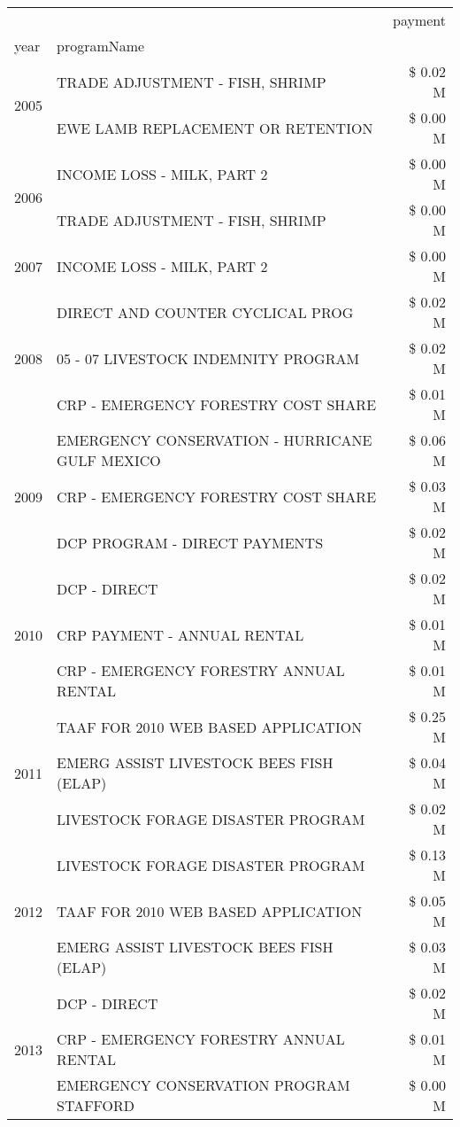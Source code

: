 \begin{tabular}{llr}
\toprule
 &  & payment \\
year & programName &  \\
\midrule
\multirow[t]{2}{*}{2005} & TRADE ADJUSTMENT - FISH, SHRIMP & \$ 0.02 M \\
 & EWE LAMB REPLACEMENT OR RETENTION & \$ 0.00 M \\
\cline{1-3}
\multirow[t]{2}{*}{2006} & INCOME LOSS - MILK, PART 2 & \$ 0.00 M \\
 & TRADE ADJUSTMENT - FISH, SHRIMP & \$ 0.00 M \\
\cline{1-3}
2007 & INCOME LOSS - MILK, PART 2 & \$ 0.00 M \\
\cline{1-3}
\multirow[t]{3}{*}{2008} & DIRECT AND COUNTER CYCLICAL PROG & \$ 0.02 M \\
 & 05 - 07 LIVESTOCK INDEMNITY PROGRAM & \$ 0.02 M \\
 & CRP - EMERGENCY FORESTRY COST SHARE & \$ 0.01 M \\
\cline{1-3}
\multirow[t]{3}{*}{2009} & EMERGENCY CONSERVATION - HURRICANE GULF MEXICO & \$ 0.06 M \\
 & CRP - EMERGENCY FORESTRY COST SHARE & \$ 0.03 M \\
 & DCP PROGRAM - DIRECT PAYMENTS & \$ 0.02 M \\
\cline{1-3}
\multirow[t]{3}{*}{2010} & DCP - DIRECT & \$ 0.02 M \\
 & CRP PAYMENT - ANNUAL RENTAL & \$ 0.01 M \\
 & CRP - EMERGENCY FORESTRY ANNUAL RENTAL & \$ 0.01 M \\
\cline{1-3}
\multirow[t]{3}{*}{2011} & TAAF FOR 2010 WEB BASED APPLICATION & \$ 0.25 M \\
 & EMERG ASSIST LIVESTOCK BEES FISH (ELAP) & \$ 0.04 M \\
 & LIVESTOCK FORAGE DISASTER PROGRAM & \$ 0.02 M \\
\cline{1-3}
\multirow[t]{3}{*}{2012} & LIVESTOCK FORAGE DISASTER PROGRAM & \$ 0.13 M \\
 & TAAF FOR 2010 WEB BASED APPLICATION & \$ 0.05 M \\
 & EMERG ASSIST LIVESTOCK BEES FISH (ELAP) & \$ 0.03 M \\
\cline{1-3}
\multirow[t]{3}{*}{2013} & DCP - DIRECT & \$ 0.02 M \\
 & CRP - EMERGENCY FORESTRY ANNUAL RENTAL & \$ 0.01 M \\
 & EMERGENCY CONSERVATION PROGRAM STAFFORD & \$ 0.00 M \\
\cline{1-3}

\end{tabular}
